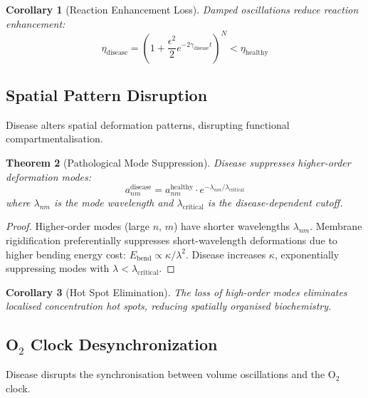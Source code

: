 \documentclass[11pt,twocolumn,a4paper]{article}
\newtheorem{theorem}{Theorem}[section]
\newtheorem{corollary}[theorem]{Corollary}
\theoremstyle{definition}
\theoremstyle{remark}
\begin{document}
\begin{corollary}[Reaction Enhancement Loss]
\label{cor:reaction_loss}
Damped oscillations reduce reaction enhancement:
\begin{equation}
\eta_{\text{disease}} = \left(1 + \frac{\epsilon^2}{2} e^{-2\gamma_{\text{disease}} t}\right)^N < \eta_{\text{healthy}}
\end{equation}
\end{corollary}

\subsection{Spatial Pattern Disruption}

Disease alters spatial deformation patterns, disrupting functional compartmentalisation.

\begin{theorem}[Pathological Mode Suppression]
\label{thm:mode_suppression}
Disease suppresses higher-order deformation modes:
\begin{equation}
a_{nm}^{\text{disease}} = a_{nm}^{\text{healthy}} \cdot e^{-\lambda_{nm}/\lambda_{\text{critical}}}
\end{equation}
where $\lambda_{nm}$ is the mode wavelength and $\lambda_{\text{critical}}$ is the disease-dependent cutoff.
\end{theorem}

\begin{proof}
Higher-order modes (large $n$, $m$) have shorter wavelengths $\lambda_{nm}$. Membrane rigidification preferentially suppresses short-wavelength deformations due to higher bending energy cost: $E_{\text{bend}} \propto \kappa/\lambda^2$. Disease increases $\kappa$, exponentially suppressing modes with $\lambda < \lambda_{\text{critical}}$.
\end{proof}

\begin{corollary}[Hot Spot Elimination]
\label{cor:hotspot_elimination}
The loss of high-order modes eliminates localised concentration hot spots, reducing spatially organised biochemistry.
\end{corollary}

\subsection{O$_2$ Clock Desynchronization}

Disease disrupts the synchronisation between volume oscillations and the O$_2$ clock.
\end{document}
